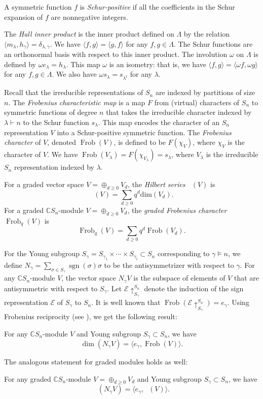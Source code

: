 \documentclass[ALCO, Unicode]{cedram}
\DeclareMathOperator{\Frob}{Frob}
\DeclareMathOperator{\Hilb}{Hilb}
\DeclareMathOperator{\sgn}{sgn}
\DeclareMathOperator{\Frobq}{\Frob_q}
\DeclareMathOperator{\Hilbq}{\Hilb_q}
\begin{document}
A symmetric function $f$ is \textit{Schur-positive} if all the coefficients in the Schur expansion of $f$ are nonnegative integers. 

The \textit{Hall inner product} is the inner product defined on $\Lambda$ by the relation $\langle m_\lambda, h_\gamma\rangle = \delta_{\lambda,\gamma}$. We have $\langle f,g\rangle = \langle g,f\rangle$ for any $f,g\in \Lambda$.
The Schur functions are an orthonormal basis with respect to this inner product.
The involution $\omega$ on $\Lambda$ is defined by $\omega e_\lambda= h_\lambda$. This map $\omega$ is an isometry: that is, we have $\langle f,g\rangle = \langle \omega f,\omega g\rangle$ for any $f,g \in \Lambda$.
We also have $\omega s_\lambda = s_{\lambda^t}$ for any $\lambda$.


Recall that the irreducible representations of $S_n$ are indexed by partitions of size $n$.
The \textit{Frobenius characteristic map} is a map $F$ from (virtual) characters of $S_n$ to symmetric functions of degree $n$ that takes the irreducible character  indexed by $\lambda\vdash n$ to the Schur function $s_\lambda$. This map encodes the character of an $S_n$ representation $V$ into a Schur-positive symmetric function.
The \textit{Frobenius character} of $V$, denoted $\Frob(V)$, is defined to be $F(\chi_V)$, where $\chi_V$ is the character of $V$. We have $\Frob(V_\lambda) = F(\chi_{V_\lambda}) = s_\lambda$, where $V_\lambda$ is the irreducible $S_n$ representation indexed by $\lambda$.

 For a graded vector space $V = \oplus_{d\geq0} V_d$, the   \textit{Hilbert series} $\Hilbq(V)$ is 
\[\Hilbq(V) = \sum\limits_{d\geq 0} q^d \text{dim}(V_d).\]
For a graded $\mathbb{C}S_n$-module $V = \oplus_{d\geq0} V_d$, the \textit{graded Frobenius character} $\Frob_q(V)$ is 
\[\Frob_q(V) = \sum\limits_{d \geq 0} q^d \Frob(V_d).\]

For the Young subgroup $S_\gamma = S_{\gamma_1} \times \cdots \times S_{\gamma_l}\subset S_n$ corresponding to $\gamma\models n$, we define $N_{\gamma} = \sum_{\sigma\in S_\gamma} \sgn(\sigma) \sigma$ to be the antisymmetrizer with respect to $\gamma$. 
For any $\mathbb{C}S_n$-module $V$, the vector space $N_\gamma V$ is the subspace of elements of $V$ that are antisymmetric with respect to $S_\gamma$.
Let $\mathcal{E}\uparrow^{S_n}_{S_\gamma}$ denote the induction of the sign representation $\mathcal{E}$ of $S_\gamma$ to $S_n$. It is well known that $\Frob(\mathcal{E}\uparrow^{S_n}_{S_\gamma}) = e_\gamma$. Using Frobenius reciprocity (see \cite[Chapter 3.3]{Fulton-Harris}), we get the following result:
\begin{prop}
    For any $\mathbb{C}S_n$-module $V$ and Young subgroup $S_\gamma \subset S_n$, we have  $$\dim(N_\gamma V) = \langle e_\gamma, \Frob(V)\rangle.$$
\end{prop}
The analogous statement for graded modules holds as well:
\begin{prop}\label{prop: dim and antisym}
    For any graded $\mathbb{C}S_n$-module $V = \oplus_{d\geq0} V_d$ and Young subgroup $S_\gamma \subset S_n$, we have  $$\Hilbq(N_\gamma V) = \langle e_\gamma, \Frobq(V)\rangle.$$
\end{prop}
\end{document}

